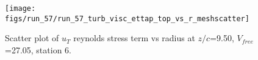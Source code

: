 \begin{figure}[H]
\centering
\texttt{[image: figs/run\_57/run\_57\_turb\_visc\_ettap\_top\_vs\_r\_meshscatter]}
\caption{Scatter plot of $
u_T$ reynolds stress term vs radius at $z/c$=9.50, $V_{free}$=27.05, station 6.}
\end{figure}


